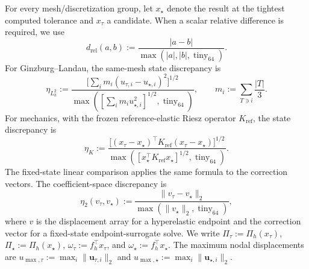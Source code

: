 For every mesh/discretization group, let $x_\star$ denote the result at the
tightest computed tolerance and $x_\tau$ a candidate. When a scalar relative
difference is required, we use
\begin{equation}
  d_{\mathrm{rel}}(a,b)
  :=\frac{|a-b|}{\max(|a|,|b|,\operatorname{tiny}_{64})}.
  \label{eq:stopping-scalar-relative-difference}
\end{equation}
For Ginzburg--Landau, the same-mesh state discrepancy is
\begin{equation}
  \eta_{L_h^2}
  :=\frac{\bigl[\sum_i m_i(u_{\tau,i}-u_{\star,i})^2\bigr]^{1/2}}
          {\max\!\left(
           [\sum_i m_i u_{\star,i}^2]^{1/2},
           \operatorname{tiny}_{64}\right)},
  \qquad
  m_i:=\sum_{T\ni i}\frac{|T|}{3}.
  \label{eq:stopping-lumped-state-difference}
\end{equation}
For mechanics, with the frozen reference-elastic Riesz operator
$K_{\mathrm{ref}}$, the state discrepancy is
\begin{equation}
  \eta_K
  :=\frac{\bigl[(x_\tau-x_\star)^\top K_{\mathrm{ref}}
                    (x_\tau-x_\star)\bigr]^{1/2}}
          {\max\!\left(
           [x_\star^\top K_{\mathrm{ref}}x_\star]^{1/2},
           \operatorname{tiny}_{64}\right)}.
  \label{eq:stopping-riesz-state-difference}
\end{equation}
The fixed-state linear comparison applies the same formula to the correction
vectors. The coefficient-space discrepancy is
\begin{equation}
  \eta_2(v_\tau,v_\star)
  :=\frac{\lVert v_\tau-v_\star\rVert_2}
          {\max(\lVert v_\star\rVert_2,\operatorname{tiny}_{64})},
  \label{eq:stopping-coefficient-state-difference}
\end{equation}
where $v$ is the displacement array for a hyperelastic endpoint and the
correction vector for a fixed-state endpoint-surrogate solve. We write
$\Pi_\tau:=\Pi_h(x_\tau)$, $\Pi_\star:=\Pi_h(x_\star)$,
$\omega_\tau:=f_h^\top x_\tau$, and $\omega_\star:=f_h^\top x_\star$. The
maximum nodal displacements are
$u_{\max,\tau}:=\max_i\lVert\boldsymbol{u}_{\tau,i}\rVert_2$ and
$u_{\max,\star}:=\max_i\lVert\boldsymbol{u}_{\star,i}\rVert_2$.

